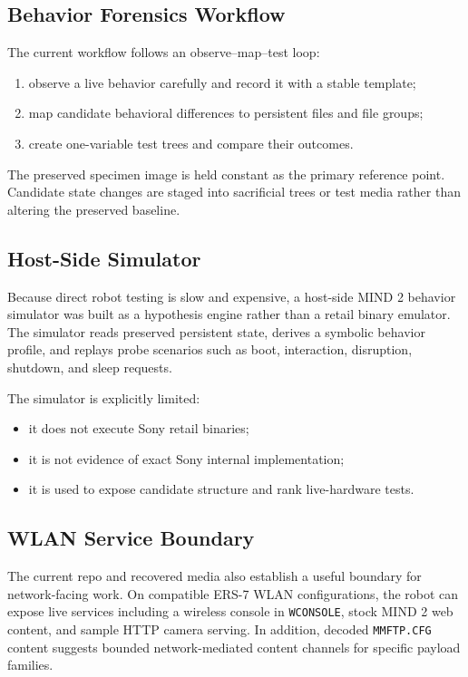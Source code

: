 \subsection{Behavior Forensics Workflow}
The current workflow follows an observe--map--test loop:
\begin{enumerate}[leftmargin=*]
\item observe a live behavior carefully and record it with a stable template;
\item map candidate behavioral differences to persistent files and file groups;
\item create one-variable test trees and compare their outcomes.
\end{enumerate}

The preserved specimen image is held constant as the primary reference point.
Candidate state changes are staged into sacrificial trees or test media rather
than altering the preserved baseline.

\subsection{Host-Side Simulator}
Because direct robot testing is slow and expensive, a host-side MIND 2
behavior simulator was built as a hypothesis engine rather than a retail
binary emulator. The simulator reads preserved persistent state, derives a
symbolic behavior profile, and replays probe scenarios such as boot,
interaction, disruption, shutdown, and sleep requests.

The simulator is explicitly limited:
\begin{itemize}[leftmargin=*]
\item it does not execute Sony retail binaries;
\item it is not evidence of exact Sony internal implementation;
\item it is used to expose candidate structure and rank live-hardware tests.
\end{itemize}

\subsection{WLAN Service Boundary}
The current repo and recovered media also establish a useful boundary for
network-facing work. On compatible ERS-7 WLAN configurations, the robot can
expose live services including a wireless console in \texttt{WCONSOLE}, stock
MIND 2 web content, and sample HTTP camera serving. In addition, decoded
\texttt{MMFTP.CFG} content suggests bounded network-mediated content channels
for specific payload families.

